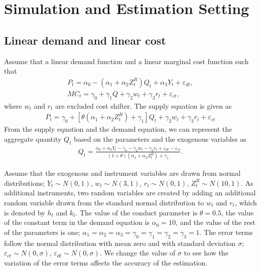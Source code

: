 \documentclass[11pt, a4paper]{article}
\begin{document}
\section{Simulation and Estimation Setting}\label{sec:simulation_and_estimation_setting}

\subsection{Linear demand and linear cost}
Assume that a linear demand function and a linear marginal cost function such that
\begin{align}
    P_t = \alpha_0 - (\alpha_1 + \alpha_2Z^R_t)Q_t + \alpha_3 Y_t + \varepsilon_{dt},\\
    MC_t = \gamma_0  + \gamma_1 Q + \gamma_2 w_t + \gamma_3 r_t + \varepsilon_{ct},
\end{align}
where $w_t$ and $r_t$ are excluded cost shifter.
The supply equation is given as
\begin{align}
    P_t = \gamma_0 + [\theta(\alpha_1 + \alpha_2Z^R_t)+ \gamma_1] Q_t   + \gamma_2 w_t + \gamma_3 r_t + \varepsilon_{ct}
\end{align}
From the supply equation and the demand equation, we can represent the aggregate quantity $Q_t$ based on the parameters and the exogenous variables as   
\begin{align}
    Q_t =  \frac{\alpha_0 + \alpha_3 Y_t - \gamma_0 - \gamma_2 w_t - \gamma_3 r_t + \varepsilon_{dt} - \varepsilon_{ct}}{(1 + \theta) (\alpha_1 + \alpha_2Z^R_t) + \gamma_1}.
\end{align}

Assume that the exogenous and instrument variables are drawn from normal distributions; $ Y_t \sim N(0,1)$, $w_t \sim N (3, 1)$, $r_t \sim N (0, 1)$, $ Z^R_t \sim N (10, 1)$.
As additional instruments, two random variables are created by adding an additional random variable drawn from the standard normal distribution to $w_t$ and $r_t$, which is denoted by $h_t$ and $k_t$.
The value of the conduct parameter is $\theta = 0.5$, the value of the constant term in the demand equation is $\alpha_0 = 10$, and the value of the rest of the parameters is one; $\alpha_1 = \alpha_2 = \alpha_3 = \gamma_0 = \gamma_1 = \gamma_2  = \gamma_3 = 1$. 
The error terms follow the normal distribution with mean zero and with standard deviation $\sigma$; $\varepsilon_{ct}\sim N(0,\sigma)$, $\varepsilon_{dt} \sim N(0,\sigma)$.
We change the value of $\sigma$ to see how the variation of the error terms affects the accuracy of the estimation.
\end{document}
